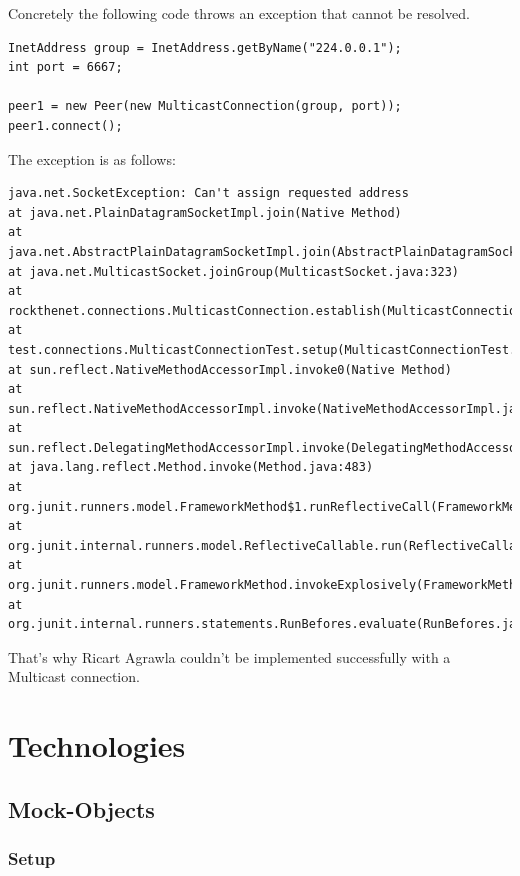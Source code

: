 \documentclass[11pt, a4paper]{article}
\begin{document}
Concretely the following code throws an exception that cannot be resolved. 

\begin{lstlisting}
InetAddress group = InetAddress.getByName("224.0.0.1");
int port = 6667;

peer1 = new Peer(new MulticastConnection(group, port));
peer1.connect();
\end{lstlisting}

The exception is as follows:

\begin{lstlisting}
java.net.SocketException: Can't assign requested address
at java.net.PlainDatagramSocketImpl.join(Native Method)
at java.net.AbstractPlainDatagramSocketImpl.join(AbstractPlainDatagramSocketImpl.java:178)
at java.net.MulticastSocket.joinGroup(MulticastSocket.java:323)
at rockthenet.connections.MulticastConnection.establish(MulticastConnection.java:48)
at test.connections.MulticastConnectionTest.setup(MulticastConnectionTest.java:29)
at sun.reflect.NativeMethodAccessorImpl.invoke0(Native Method)
at sun.reflect.NativeMethodAccessorImpl.invoke(NativeMethodAccessorImpl.java:62)
at sun.reflect.DelegatingMethodAccessorImpl.invoke(DelegatingMethodAccessorImpl.java:43)
at java.lang.reflect.Method.invoke(Method.java:483)
at org.junit.runners.model.FrameworkMethod$1.runReflectiveCall(FrameworkMethod.java:47)
at org.junit.internal.runners.model.ReflectiveCallable.run(ReflectiveCallable.java:12)
at org.junit.runners.model.FrameworkMethod.invokeExplosively(FrameworkMethod.java:44)
at org.junit.internal.runners.statements.RunBefores.evaluate(RunBefores.java:24)
\end{lstlisting}

That's why Ricart Agrawla couldn't be implemented successfully with a Multicast connection. 







\newpage

\section{Technologies}
\subsection{Mock-Objects}
\subsubsection{Setup}
\end{document}
